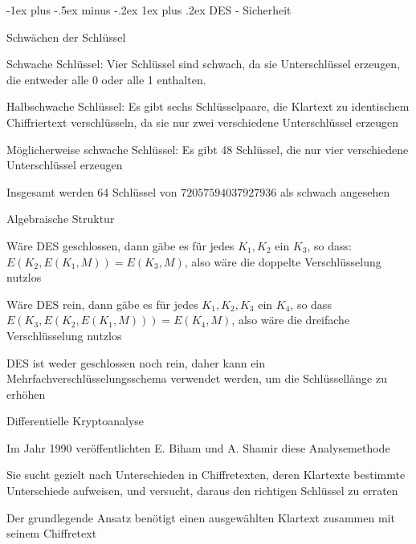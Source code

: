 \documentclass[a4paper]{article}
\makeatletter
\renewcommand{\subsubsection}{\@startsection{subsubsection}{3}{0mm}%
 {-1ex plus -.5ex minus -.2ex}%
 {1ex plus .2ex}%
 {\normalfont\small\bfseries}}
\makeatother
\begin{document}
\begin{multicols}{3}
      \subsubsection{DES - Sicherheit}
      \begin{itemize*}
            \item Schwächen der Schlüssel
            \begin{itemize*}
                  \item Schwache Schlüssel: Vier Schlüssel sind schwach, da sie Unterschlüssel erzeugen, die entweder alle 0 oder alle 1 enthalten.
                  \item Halbschwache Schlüssel: Es gibt sechs Schlüsselpaare, die Klartext zu identischem Chiffriertext verschlüsseln, da sie nur zwei verschiedene Unterschlüssel erzeugen
                  \item Möglicherweise schwache Schlüssel: Es gibt 48 Schlüssel, die nur vier verschiedene Unterschlüssel erzeugen
                  \item Insgesamt werden 64 Schlüssel von $72057594037927936$ als schwach angesehen
            \end{itemize*}
            \item Algebraische Struktur
            \begin{itemize*}
                  \item Wäre DES geschlossen, dann gäbe es für jedes $K_1,K_2$ ein $K_3$, so dass: $E(K_2,E(K_1,M))=E(K_3,M)$, also wäre die doppelte Verschlüsselung nutzlos
                  \item Wäre DES rein, dann gäbe es für jedes $K_1,K_2,K_3$ ein $K_4$, so dass $E(K_3,E(K_2,E(K_1,M)))=E(K_4,M)$, also wäre die dreifache Verschlüsselung nutzlos
                  \item DES ist weder geschlossen noch rein, daher kann ein Mehrfachverschlüsselungsschema verwendet werden, um die Schlüssellänge zu erhöhen
            \end{itemize*}
            \item Differentielle Kryptoanalyse
            \begin{itemize*}
                  \item Im Jahr 1990 veröffentlichten E. Biham und A. Shamir diese Analysemethode
                  \item Sie sucht gezielt nach Unterschieden in Chiffretexten, deren Klartexte bestimmte Unterschiede aufweisen, und versucht, daraus den richtigen Schlüssel zu erraten
                  \item Der grundlegende Ansatz benötigt einen ausgewählten Klartext zusammen mit seinem Chiffretext

\end{itemize*}
\end{itemize*}
\end{multicols}
\end{document}
